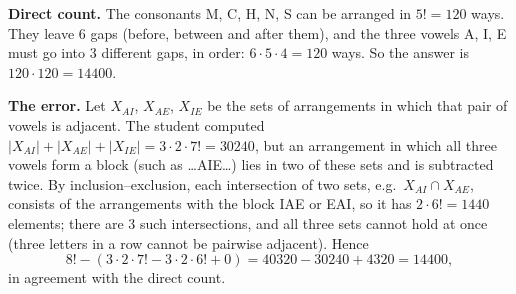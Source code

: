 \textbf{Direct count.} The consonants M, C, H, N, S can be arranged in $5!=120$ ways. They leave $6$ gaps (before, between and after them), and the three vowels A, I, E must go into $3$ different gaps, in order: $6\cdot5\cdot4=120$ ways. So the answer is $120\cdot120=\boxed{14400}$.

\textbf{The error.} Let $X_{AI}$, $X_{AE}$, $X_{IE}$ be the sets of arrangements in which that pair of vowels is adjacent. The student computed $|X_{AI}|+|X_{AE}|+|X_{IE}|=3\cdot2\cdot7!=30240$, but an arrangement in which all three vowels form a block (such as \dots AIE\dots) lies in two of these sets and is subtracted twice. By inclusion--exclusion, each intersection of two sets, e.g.\ $X_{AI}\cap X_{AE}$, consists of the arrangements with the block IAE or EAI, so it has $2\cdot6!=1440$ elements; there are $3$ such intersections, and all three sets cannot hold at once (three letters in a row cannot be pairwise adjacent). Hence
\[
8!-\left(3\cdot2\cdot7!-3\cdot2\cdot6!+0\right)=40320-30240+4320=14400,
\]
in agreement with the direct count.
